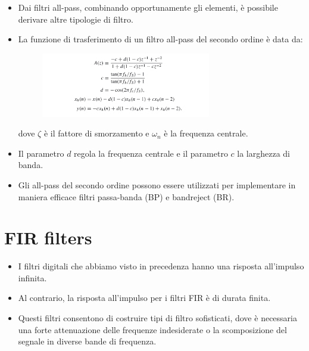 \begin{itemize}
    \item Dai filtri all-pass, combinando opportunamente gli elementi, è possibile derivare altre tipologie di filtro.
    
    \item La funzione di trasferimento di un filtro all-pass del secondo ordine è data da:

    \begin{figure}[H]
        \centering
        \includegraphics[width=0.7\textwidth]{capitoli/capitolo15/immagini/image7.png}
    \end{figure}

    dove $\zeta$ è il fattore di smorzamento e $\omega_n$ è la frequenza centrale.

    \item Il parametro $d$ regola la frequenza centrale e il parametro $c$ la larghezza di banda.
\end{itemize}

\bigskip

\begin{itemize}
    \item Gli all-pass del secondo ordine possono essere utilizzati per implementare in maniera efficace filtri passa-banda (BP) e bandreject (BR).
\end{itemize}

\section{FIR filters}

\begin{itemize}
    \item I filtri digitali che abbiamo visto in precedenza hanno una risposta all'impulso infinita.
    
    \item Al contrario, la risposta all’impulso per i filtri FIR è di durata finita.
    
    \item Questi filtri consentono di costruire tipi di filtro sofisticati, dove è necessaria una forte attenuazione delle frequenze indesiderate o la scomposizione del segnale in diverse bande di frequenza.
\end{itemize}

